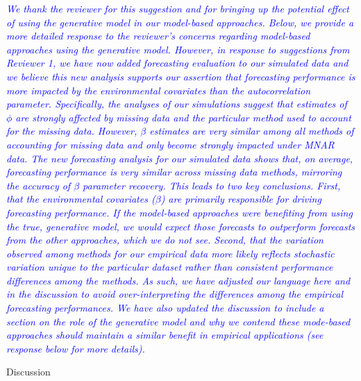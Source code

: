 \documentclass{article}
\begin{document}
\begin{linenumbers}
\noindent \textcolor{blue}{\textit{We thank the reviewer for this suggestion and for bringing up the potential effect of using the generative model in our model-based approaches. Below, we provide a more detailed response to the reviewer's concerns regarding model-based approaches using the generative model. However, in response to suggestions from Reviewer 1, we have now added forecasting evaluation to our simulated data and we believe this new analysis supports our assertion that forecasting performance is more impacted by the environmental covariates than the autocorrelation parameter. Specifically, the analyses of our simulations suggest that estimates of $\phi$ are strongly affected by missing data and the particular method used to account for the missing data. However, $\beta$ estimates are very similar among all methods of accounting for missing data and only become strongly impacted under MNAR data. The new forecasting analysis for our simulated data shows that, on average, forecasting performance is very similar across missing data methods, mirroring the accuracy of $\beta$ parameter recovery. This leads to two key conclusions. First, that the environmental covariates ($\beta$) are primarily responsible for driving forecasting performance. If the model-based approaches were benefiting from using the true, generative model, we would expect those forecasts to outperform forecasts from the other approaches, which we do not see. Second, that the variation observed among methods for our empirical data more likely reflects stochastic variation unique to the particular dataset rather than consistent performance differences among the methods. As such, we have adjusted our language here and in the discussion to avoid over-interpreting the differences among the empirical forecasting performances. We have also updated the discussion to include a section on the role of the generative model and why we contend these mode-based approaches should maintain a similar benefit in empirical applications (see response below for more details).}} 

\bigskip 


Discussion


\end{linenumbers}
\end{document}
